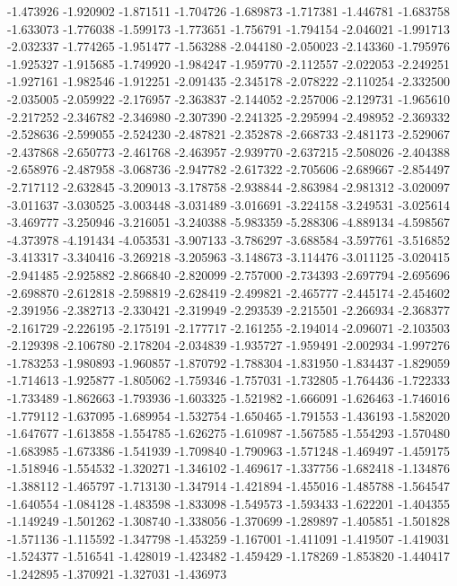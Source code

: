-1.473926
-1.920902
-1.871511
-1.704726
-1.689873
-1.717381
-1.446781
-1.683758
-1.633073
-1.776038
-1.599173
-1.773651
-1.756791
-1.794154
-2.046021
-1.991713
-2.032337
-1.774265
-1.951477
-1.563288
-2.044180
-2.050023
-2.143360
-1.795976
-1.925327
-1.915685
-1.749920
-1.984247
-1.959770
-2.112557
-2.022053
-2.249251
-1.927161
-1.982546
-1.912251
-2.091435
-2.345178
-2.078222
-2.110254
-2.332500
-2.035005
-2.059922
-2.176957
-2.363837
-2.144052
-2.257006
-2.129731
-1.965610
-2.217252
-2.346782
-2.346980
-2.307390
-2.241325
-2.295994
-2.498952
-2.369332
-2.528636
-2.599055
-2.524230
-2.487821
-2.352878
-2.668733
-2.481173
-2.529067
-2.437868
-2.650773
-2.461768
-2.463957
-2.939770
-2.637215
-2.508026
-2.404388
-2.658976
-2.487958
-3.068736
-2.947782
-2.617322
-2.705606
-2.689667
-2.854497
-2.717112
-2.632845
-3.209013
-3.178758
-2.938844
-2.863984
-2.981312
-3.020097
-3.011637
-3.030525
-3.003448
-3.031489
-3.016691
-3.224158
-3.249531
-3.025614
-3.469777
-3.250946
-3.216051
-3.240388
-5.983359
-5.288306
-4.889134
-4.598567
-4.373978
-4.191434
-4.053531
-3.907133
-3.786297
-3.688584
-3.597761
-3.516852
-3.413317
-3.340416
-3.269218
-3.205963
-3.148673
-3.114476
-3.011125
-3.020415
-2.941485
-2.925882
-2.866840
-2.820099
-2.757000
-2.734393
-2.697794
-2.695696
-2.698870
-2.612818
-2.598819
-2.628419
-2.499821
-2.465777
-2.445174
-2.454602
-2.391956
-2.382713
-2.330421
-2.319949
-2.293539
-2.215501
-2.266934
-2.368377
-2.161729
-2.226195
-2.175191
-2.177717
-2.161255
-2.194014
-2.096071
-2.103503
-2.129398
-2.106780
-2.178204
-2.034839
-1.935727
-1.959491
-2.002934
-1.997276
-1.783253
-1.980893
-1.960857
-1.870792
-1.788304
-1.831950
-1.834437
-1.829059
-1.714613
-1.925877
-1.805062
-1.759346
-1.757031
-1.732805
-1.764436
-1.722333
-1.733489
-1.862663
-1.793936
-1.603325
-1.521982
-1.666091
-1.626463
-1.746016
-1.779112
-1.637095
-1.689954
-1.532754
-1.650465
-1.791553
-1.436193
-1.582020
-1.647677
-1.613858
-1.554785
-1.626275
-1.610987
-1.567585
-1.554293
-1.570480
-1.683985
-1.673386
-1.541939
-1.709840
-1.790963
-1.571248
-1.469497
-1.459175
-1.518946
-1.554532
-1.320271
-1.346102
-1.469617
-1.337756
-1.682418
-1.134876
-1.388112
-1.465797
-1.713130
-1.347914
-1.421894
-1.455016
-1.485788
-1.564547
-1.640554
-1.084128
-1.483598
-1.833098
-1.549573
-1.593433
-1.622201
-1.404355
-1.149249
-1.501262
-1.308740
-1.338056
-1.370699
-1.289897
-1.405851
-1.501828
-1.571136
-1.115592
-1.347798
-1.453259
-1.167001
-1.411091
-1.419507
-1.419031
-1.524377
-1.516541
-1.428019
-1.423482
-1.459429
-1.178269
-1.853820
-1.440417
-1.242895
-1.370921
-1.327031
-1.436973
